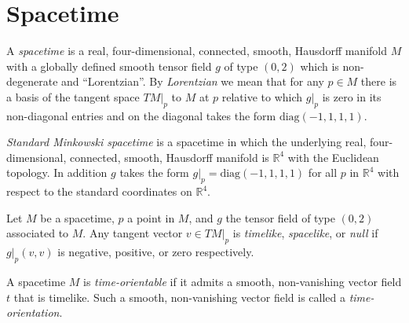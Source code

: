 \section{Spacetime}\label{sctn:spacetime}
\begin{definition}[Spacetime]
    \label{def:spacetime}
    \leanok
    A \textit{spacetime} is a real, four-dimensional, connected, smooth, Hausdorff manifold $M$ with a globally defined smooth tensor field $g$ of type $(0,2)$ which is non-degenerate and ``Lorentzian''. By \textit{Lorentzian} we mean that for any $p \in M$ there is a basis of the tangent space $TM|_p$ to $M$ at $p$ relative to which $g|_p$ is zero in its non-diagonal entries and on the diagonal takes the form $\text{diag}(-1,1,1,1)$.
\end{definition}

\begin{definition}
    \label{def:standard-minkowski-spacetime}
    \leanok
    \textit{Standard Minkowski spacetime} is a spacetime in which the underlying real, four-dimensional, connected, smooth, Hausdorff manifold is $\mathbb{R}^4$ with the Euclidean topology. In addition $g$ takes the form $g|_p=\text{diag}(-1,1,1,1)$ for all $p$ in $\mathbb{R}^4$ with respect to the standard coordinates on $\mathbb{R}^4$.
\end{definition}

\begin{definition}
    \label{def:timelike-spacelike-null-vectors}
    \leanok
    Let $M$ be a spacetime, $p$ a point in $M$, and $g$ the tensor field of type $(0,2)$ associated to $M$. Any tangent vector $v \in TM|_p$ is \textit{timelike}, \textit{spacelike}, or \textit{null} if $g|_p(v,v)$ is negative, positive, or zero respectively.
\end{definition}

\begin{definition}
    \label{def:time-orientable}
    \leanok
    A spacetime $M$ is \textit{time-orientable} if it admits a smooth, non-vanishing vector field $t$ that is timelike. Such a smooth, non-vanishing vector field is called a \textit{time-orientation}.
\end{definition}

